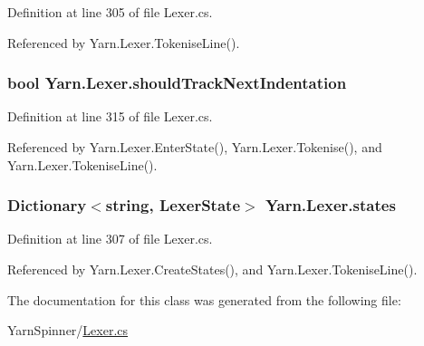 Definition at line 305 of file Lexer.\-cs.



Referenced by Yarn.\-Lexer.\-Tokenise\-Line().

\hypertarget{a00127_ac670aac2245cbd4694dfbd5b69313218}{
\subsubsection[{should\-Track\-Next\-Indentation}]{\setlength{\rightskip}{0pt plus 5cm}bool Yarn.\-Lexer.\-should\-Track\-Next\-Indentation\hspace{0.3cm}{\ttfamily [private]}}}\label{a00127_ac670aac2245cbd4694dfbd5b69313218}


Definition at line 315 of file Lexer.\-cs.



Referenced by Yarn.\-Lexer.\-Enter\-State(), Yarn.\-Lexer.\-Tokenise(), and Yarn.\-Lexer.\-Tokenise\-Line().

\hypertarget{a00127_a2c65c0ba90f973e459583badefef216a}{
\subsubsection[{states}]{\setlength{\rightskip}{0pt plus 5cm}Dictionary$<$string, {\bf Lexer\-State}$>$ Yarn.\-Lexer.\-states\hspace{0.3cm}{\ttfamily [private]}}}\label{a00127_a2c65c0ba90f973e459583badefef216a}


Definition at line 307 of file Lexer.\-cs.



Referenced by Yarn.\-Lexer.\-Create\-States(), and Yarn.\-Lexer.\-Tokenise\-Line().



The documentation for this class was generated from the following file\-:\begin{DoxyCompactItemize}
\item 
Yarn\-Spinner/\hyperlink{a00310}{Lexer.\-cs}\end{DoxyCompactItemize}
